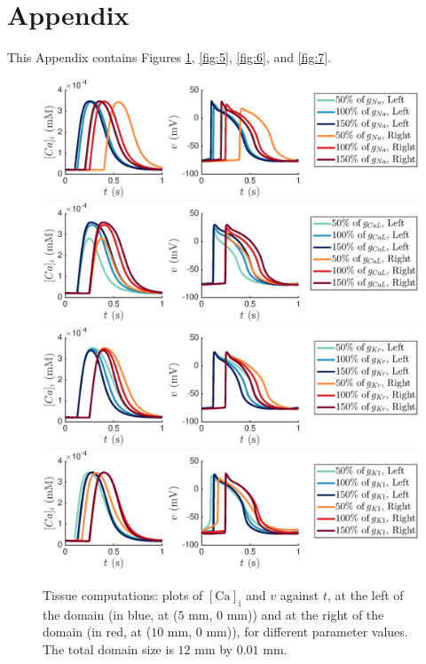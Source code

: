 \documentclass{article}
\begin{document}
\section*{Appendix} \label{Appendix}
%
This Appendix contains Figures \ref{fig:4}, \ref{fig:5}, \ref{fig:6}, and \ref{fig:7}.
\begin{figure}
   \includegraphics[trim=3cm 0cm 4cm 0cm, clip=true, width=1\linewidth]{strip_gna} 
   \includegraphics[trim=3cm 0cm 4cm 0cm, clip=true, width=1\linewidth]{strip_gcal} 
      \includegraphics[trim=3cm 0cm 4cm 0cm, clip=true, width=1\linewidth]{strip_gkr} 
         \includegraphics[trim=3cm 0cm 4cm 0cm, clip=true, width=1\linewidth]{strip_gk1} 
    \caption{Tissue computations: plots of $[\mathrm{Ca}]_{\mathrm{i}}$ and $v$ against $t$, at the left of the domain (in blue, at ($5$ mm, $0$ mm)) and at the right of the domain (in red, at ($10$ mm, $0$ mm)), for different parameter values. The total domain size is $12$ mm by $0.01$ mm.}
    \label{fig:4}
\end{figure}
\end{document}
